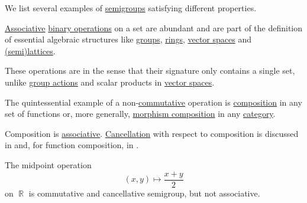 \begin{example}\label{ex:def:binary_operation}
  We list several examples of \hyperref[def:semigroup]{semigroups} satisfying different properties.

  \begin{thmenum}
     \hyperref[eq:def:binary_operation/associative]{Associative} \hyperref[def:binary_operation]{binary operations} on a set are abundant and are part of the definition of essential algebraic structures like \hyperref[def:group]{groups}, \hyperref[def:ring]{rings}, \hyperref[def:vector_space]{vector spaces} and \hyperref[def:lattice]{(semi)lattices}.

    These operations are  in the sense that their signature only contains a single set, unlike \hyperref[def:group_action]{group actions} and scalar products in \hyperref[def:vector_space]{vector spaces}.

     The quintessential example of a non-\hyperref[def:binary_operation/commutative]{commutative} operation is \hyperref[def:set_valued_map/composition]{composition} in any set of functions or, more generally, \hyperref[def:category/composition]{morphism composition} in any \hyperref[def:category]{category}.

    Composition is \hyperref[def:binary_operation/associative]{associative}. \hyperref[def:binary_operation/cancellative]{Cancellation} with respect to composition is discussed in  and, for function composition, in .

     The midpoint operation
    \begin{equation*}
      (x, y) \mapsto \dfrac {x + y} 2
    \end{equation*}
    on \( \BbbR \) is commutative and cancellative semigroup, but not associative.
  \end{thmenum}
\end{example}

